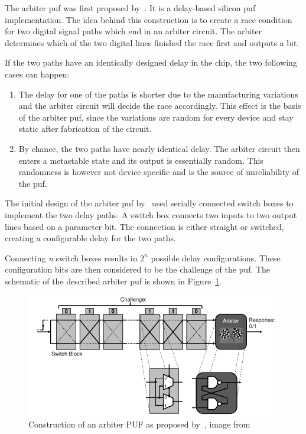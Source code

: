 The arbiter \gls{puf} was first proposed by~\cite{Lee2004}. It is a delay-based silicon \gls{puf} implementation. The idea behind this construction is to create a race condition for two digital signal paths which end in an arbiter circuit. The arbiter determines which of the two digital lines finished the race first and outputs a bit.

If the two paths have an identically designed delay in the chip, the two following cases can happen\cite{Maes2013}:

\begin{enumerate}
    \item The delay for one of the paths is shorter due to the manufacturing variations and the arbiter circuit will decide the race accordingly. This effect is the basis of the arbiter \gls{puf}, since the variations are random for every device and stay static after fabrication of the circuit.
    \item By chance, the two paths have nearly identical delay. The arbiter circuit then enters a metastable state and its output is essentially random. This randomness is however not device specific and is the source of unreliability of the \gls{puf}.
\end{enumerate}

The initial design of the arbiter \gls{puf} by~\cite{Lee2004} used serially connected switch boxes to implement the two delay paths. A switch box connects two inputs to two output lines based on a parameter bit. The connection is either straight or switched, creating a configurable delay for the two paths.

Connecting \emph{n} switch boxes results in $2^n$ possible delay configurations. These configuration bits are then considered to be the challenge of the \gls{puf}. The schematic of the described arbiter \gls{puf} is shown in Figure~\ref{fig:arbiter_puf}.

\begin{figure}[h!]
    \centering
    \captionsetup{justification=centering,margin=0.5cm}
    \includegraphics[width=\textwidth]{images/arbiter_puf.pdf}
    \caption[Construction of an arbiter PUF]{Construction of an arbiter PUF as proposed by~\cite{Lee2004}, image from~\cite{Maes2012}}
    \label{fig:arbiter_puf}
\end{figure}

